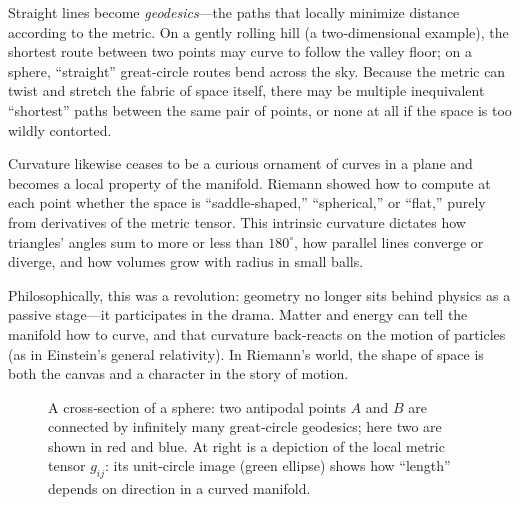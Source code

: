 Straight lines become \emph{geodesics}—the paths that locally minimize distance according to the metric.  On a gently rolling hill (a two‐dimensional example), the shortest route between two points may curve to follow the valley floor; on a sphere, “straight” great‐circle routes bend across the sky.  Because the metric can twist and stretch the fabric of space itself, there may be multiple inequivalent “shortest” paths between the same pair of points, or none at all if the space is too wildly contorted.

Curvature likewise ceases to be a curious ornament of curves in a plane and becomes a local property of the manifold.  Riemann showed how to compute at each point whether the space is “saddle‐shaped,” “spherical,” or “flat,” purely from derivatives of the metric tensor.  This intrinsic curvature dictates how triangles’ angles sum to more or less than \(180^\circ\), how parallel lines converge or diverge, and how volumes grow with radius in small balls.

Philosophically, this was a revolution: geometry no longer sits behind physics as a passive stage—it participates in the drama.  Matter and energy can tell the manifold how to curve, and that curvature back‐reacts on the motion of particles (as in Einstein’s general relativity).  In Riemann’s world, the shape of space is both the canvas and a character in the story of motion.

\begin{figure}[H]
    \centering
    \caption{%
    A cross‐section of a sphere: two antipodal points \(A\) and \(B\) are connected by infinitely many great‐circle geodesics; here two are shown in red and blue.  
    At right is a depiction of the local metric tensor \(g_{ij}\): its unit‐circle image (green ellipse) shows how “length” depends on direction in a curved manifold.}
\end{figure}


